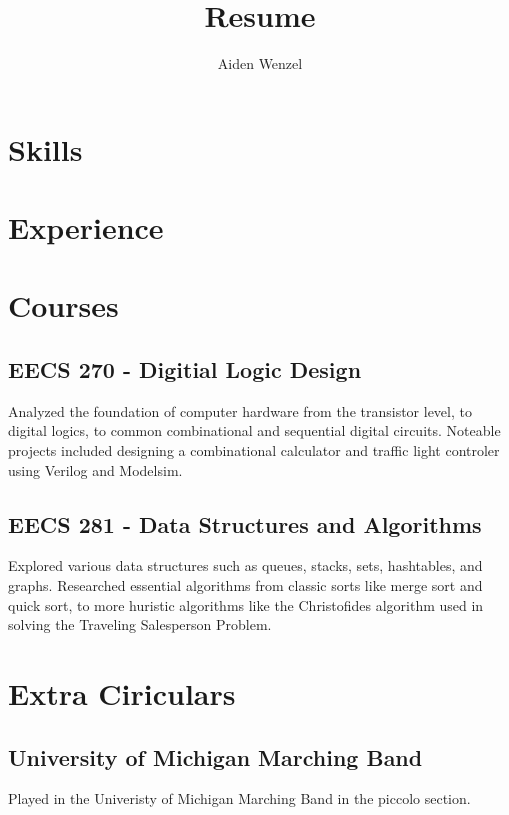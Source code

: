 \documentclass{article}
\title{Resume}
\author{Aiden Wenzel}
\begin{document}
		
\maketitle

\section{Skills}

\section{Experience}

\section{Courses}
\subsection{EECS 270 - Digitial Logic Design}
Analyzed the foundation of computer hardware from the transistor level,
to digital logics, to common combinational and sequential digital circuits. 
Noteable projects included designing a combinational calculator and traffic light controler
using Verilog and Modelsim.

\subsection{EECS 281 - Data Structures and Algorithms}
Explored various data structures such as queues, stacks, sets, hashtables, and graphs.
Researched essential algorithms from classic sorts like merge sort and quick sort, to more huristic algorithms like the
Christofides algorithm used in solving the Traveling Salesperson Problem.

\section{Extra Ciriculars}
\subsection{University of Michigan Marching Band}
Played in the Univeristy of Michigan Marching Band in the piccolo section.
\end{document}
